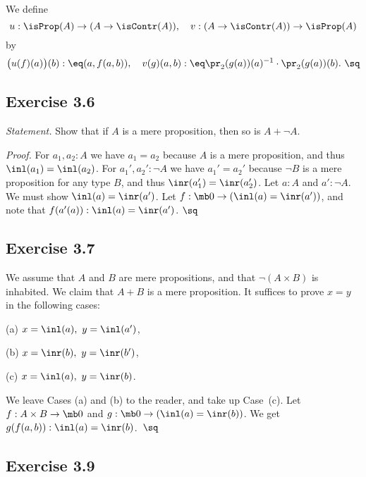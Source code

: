 \documentclass[12pt]{article}
\begin{document}
We define 
$$
u:\isProp(A)\to(A\to\isContr(A)),\quad v:(A\to\isContr(A))\to\isProp(A)
$$ 
by 
$$
\big(u(f)(a)\big)(b):\eq(a,f(a,b)),\quad v(g)(a,b):\eq\pr_2(g(a))(a)^{-1}\cdot\pr_2(g(a))(b).\ \sq
$$


\subsection{Exercise 3.6}\label{e36}

\emph{Statement.} Show that if $A$ is a mere proposition, then so is $A+\neg A$.

\nn\emph{Proof.} For $a_1,a_2:A$ we have $a_1=a_2$ because $A$ is a mere proposition, and thus $\inl(a_1)=\inl(a_2)$. For $a_1',a_2':\neg A$ we have $a_1'=a_2'$ because $\neg B$ is a mere proposition for any type $B$, and thus $\inr(a_1')=\inr(a_2')$. Let $a:A$ and $a':\neg A$. We must show $\inl(a)=\inr(a')$. Let $f:\mb0\to(\inl(a)=\inr(a'))$, and note that $f(a'(a)):\inl(a)=\inr(a')$. $\sq$


\subsection{Exercise 3.7}

We assume that $A$ and $B$ are mere propositions, and that $\neg(A\times B)$ is inhabited. We claim that $A+B$ is a mere proposition. It suffices to prove $x=y$ in the following cases:

(a) $x=\inl(a),\ y=\inl(a')$,

(b) $x=\inr(b),\ y=\inr(b')$,

(c) $x=\inl(a),\ y=\inr(b)$.

\nn We leave Cases (a) and (b) to the reader, and take up Case~(c). Let $f:A\times B\to\mb0$ and $g:\mb0\to(\inl(a)=\inr(b))$. We get $g(f(a,b)):\inl(a)=\inr(b)$.\ $\sq$


\subsection{Exercise 3.9}
\end{document}
